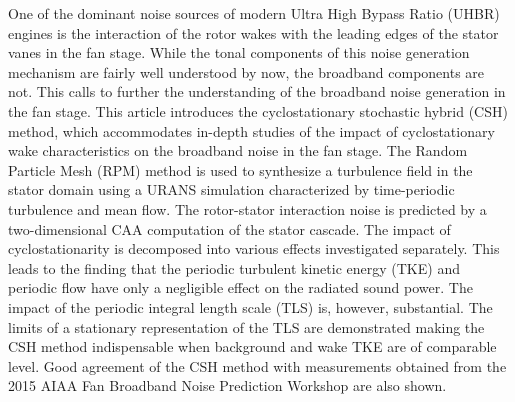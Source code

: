 One of the dominant noise sources of modern Ultra High Bypass Ratio (UHBR) engines is the interaction of the rotor wakes with the leading edges of the stator vanes in the fan stage.  While the tonal components of this noise generation mechanism are fairly well understood by now, the broadband components are not.  This calls to further the understanding of the broadband noise generation in the fan stage.
This article introduces the cyclostationary stochastic hybrid (CSH) method, which accommodates in-depth studies of the impact of cyclostationary wake characteristics on the broadband noise in the fan stage.  The Random Particle Mesh (RPM) method is used to synthesize a turbulence field in the stator domain using a URANS simulation characterized by time-periodic turbulence and mean flow. The rotor-stator interaction noise is predicted by a two-dimensional CAA computation of the stator cascade. The impact of cyclostationarity is decomposed into various effects investigated separately. This leads to the finding that the periodic turbulent kinetic energy (TKE) and periodic flow have only a negligible effect on the radiated sound power. The impact of the periodic integral length scale (TLS) is, however, substantial. The limits of a stationary representation of the TLS are demonstrated making the CSH method indispensable when background and wake TKE are of comparable level. Good agreement of the CSH method with measurements obtained from the 2015 AIAA Fan Broadband Noise Prediction Workshop are also shown. 

